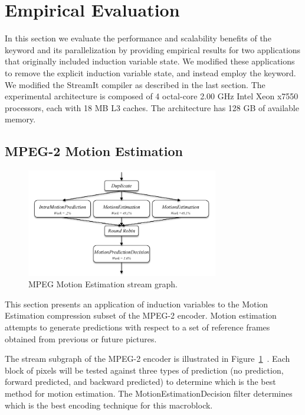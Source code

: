 \section{Empirical Evaluation}
\label{sec:analysis}

In this section we evaluate the performance and scalability benefits
of the \iter keyword and its parallelization by providing empirical
results for two applications that originally included induction
variable state. We modified these applications to remove the explicit
induction variable state, and instead employ the \iter keyword. We
modified the StreamIt compiler as described in the last section.  The
experimental architecture is composed of 4 octal-core 2.00 GHz Intel
Xeon x7550 processors, each with 18 MB L3 caches. The architecture has
128 GB of available memory.

\subsection{MPEG-2 Motion Estimation}
\label{sec:mpeg}

\begin{figure}[t]
\includegraphics[width=3.3in]{figures/work_estimate_mpeg_motionestimation.pdf}
\caption{MPEG Motion Estimation stream graph.\protect\label{fig:mpegMEgraph}}
\end{figure}


This section presents an application of induction variables to the Motion Estimation compression subset of the MPEG-2 encoder.  Motion estimation attempts to generate predictions with respect to a set of reference frames obtained from previous or future pictures.  

The stream subgraph of the MPEG-2 encoder is illustrated in Figure~\ref{fig:mpegMEgraph}~\cite{drake-thesis}.  Each block of pixels will be tested against three types of prediction (no prediction, forward predicted, and backward predicted) to determine which is the best method for motion estimation.  The MotionEstimationDecision filter determines which is the best encoding technique for this macroblock.

